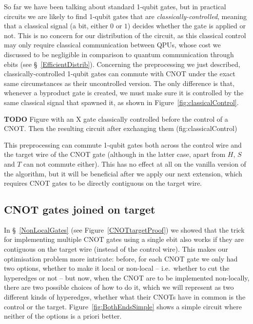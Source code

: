 So far we have been talking about standard 1-qubit gates, but in practical circuits we are likely to find 1-qubit gates that are \textit{classically-controlled}, meaning that a classical signal (a bit, either \(0\) or \(1\)) decides whether the gate is applied or not. This is no concern for our distribution of the circuit, as this classical control may only require classical communication between QPUs, whose cost we discussed to be negligible in comparison to quantum communication through ebits (see \S~\ref{EfficientDistrib}). Concerning the preprocessing we just described, classically-controlled 1-qubit gates can commute with CNOT under the exact same circumstances as their uncontrolled version. The only difference is that, whenever a byproduct gate is created, we must make sure it is controlled by the same classical signal that spawned it, as shown in Figure~\ref{fig:classicalControl}.

\textbf{TODO} Figure with an X gate classically controlled before the control of a CNOT. Then the resulting circuit after exchanging them (fig:classicalControl)

This preprocessing can commute 1-qubit gates both across the control wire and the target wire of the CNOT gate (although in the latter case, apart from \(H\), \(S\) and \(T\) can not commute either). This has no effect at all on the vanilla version of the algorithm, but it will be beneficial after we apply our next extension, which requires CNOT gates to be directly contiguous on the target wire.


\subsection{CNOT gates joined on target}
\label{BothEnds}

In \S~\ref{NonLocalGates} (see Figure~\ref{CNOTtargetProof}) we showed that the trick for implementing multiple CNOT gates using a single ebit also works if they are contiguous on the target wire (instead of the control wire). This makes our optimisation problem more intricate: before, for each CNOT gate we only had two options, whether to make it local or non-local -- i.e.\ whether to cut the hyperedges or not -- but now, when the CNOT are to be implemented non-locally, there are two possible choices of how to do it, which we will represent as two different kinds of hyperedges, whether what their CNOTs have in common is the control or the target. Figure~\ref{fig:BothEndsSimple} shows a simple circuit where neither of the options is a priori better. 

